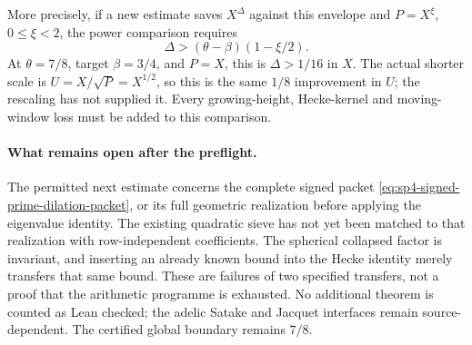 More precisely, if a new estimate saves \(X^\Delta\) against this
envelope and \(P=X^\xi\), \(0\le\xi<2\), the power comparison
requires
\[
 \Delta>(\theta-\beta)(1-\xi/2).
\]
At \(\theta=7/8\), target \(\beta=3/4\), and \(P=X\), this is
\(\Delta>1/16\) in \(X\). The actual shorter scale is
\(U=X/\sqrt P=X^{1/2}\), so this is the same \(1/8\) improvement
in \(U\); the rescaling has not supplied it. Every growing-height,
Hecke-kernel and moving-window loss must be added to this comparison.

\paragraph{What remains open after the preflight.}
The permitted next estimate concerns the complete signed packet
\eqref{eq:sp4-signed-prime-dilation-packet}, or its full geometric
realization before applying the eigenvalue identity. The existing
quadratic sieve has not yet been matched to that realization with
row-independent coefficients. The spherical collapsed factor is
invariant, and inserting an already known bound into the Hecke
identity merely transfers that same bound. These are failures of
two specified transfers, not a proof that the arithmetic programme
is exhausted. No additional theorem is counted as Lean checked;
the adelic Satake and Jacquet interfaces remain source-dependent.
The certified global boundary remains \(7/8\).
